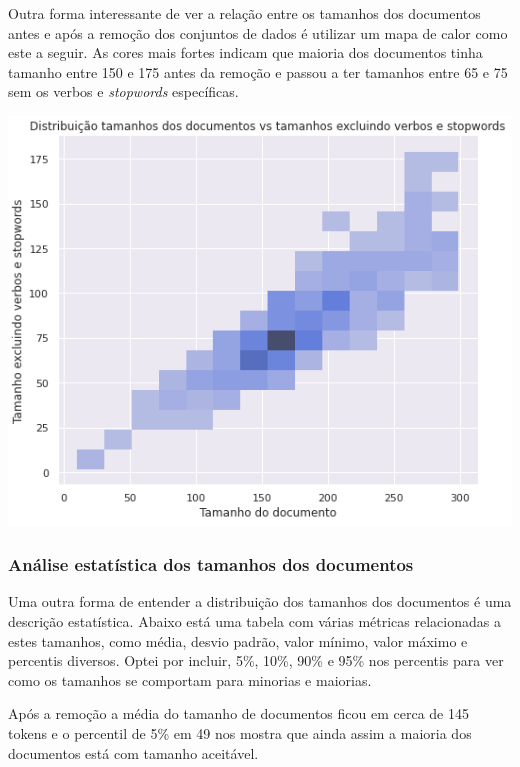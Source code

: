 Outra forma interessante de ver a relação entre os tamanhos dos documentos antes e após a remoção dos conjuntos de dados é utilizar 
um mapa de calor como este a seguir. As cores mais fortes indicam que maioria dos documentos tinha tamanho entre 150 e 175 antes da remoção
e passou a ter tamanhos entre 65 e 75 sem os verbos e \textit{stopwords} específicas.

\includegraphics[scale=0.6]{explore/resources/tamanho_documentos_heatmap.png}

\subsubsection{Análise estatística dos tamanhos dos documentos}

Uma outra forma de entender a distribuição dos tamanhos dos documentos é uma descrição estatística. Abaixo está uma tabela 
com várias métricas relacionadas a estes tamanhos, como média, desvio padrão, valor mínimo, valor máximo e percentis diversos.
Optei por incluir, 5\%, 10\%, 90\% e 95\% nos percentis para ver como os tamanhos se comportam para minorias e maiorias.

Após a remoção a média do tamanho de documentos ficou em cerca de 145 tokens e o percentil de 5\% em 49 nos mostra que ainda 
assim a maioria dos documentos está com tamanho aceitável.


